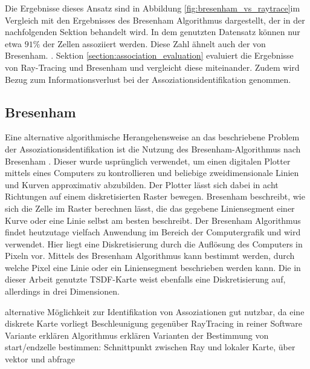 Die Ergebnisse dieses Ansatz sind in Abbildung \ref{fig:bresenham_vs_raytrace}im Vergleich mit den Ergebnisses des Bresenham Algorithmus dargestellt, der in der nachfolgenden Sektion behandelt wird. In dem genutzten Datensatz können nur etwa $91\%$ der Zellen assoziiert werden. Diese Zahl ähnelt auch der von Bresenham. . Sektion \ref{section:association_evaluation} evaluiert die Ergebnisse von Ray-Tracing und Bresenham und vergleicht diese miteinander. Zudem wird Bezug zum Informationsverlust bei der Assoziationsidentifikation genommen.




\subsection{Bresenham}

Eine alternative algorithmische Herangehensweise an das beschriebene Problem der Assoziationsidentifikation ist die Nutzung des Bresenham-Algorithmus nach Bresenham \cite{bresenham1965algorithm}. Dieser wurde usprünglich verwendet, um einen digitalen Plotter mittels eines Computers zu kontrollieren und beliebige zweidimensionale Linien und Kurven approximativ abzubilden. Der Plotter lässt sich dabei in acht Richtungen auf einem diskretisierten Raster bewegen. Bresenham \cite{bresenham1965algorithm} beschreibt, wie sich die Zelle im Raster berechnen lässt, die das gegebene Liniensegment einer Kurve oder eine Linie selbst am besten beschreibt. Der Bresenham Algorithmus findet heutzutage vielfach Anwendung im Bereich der Computergrafik und wird verwendet. Hier liegt eine Diskretisierung durch die Auflösung des Computers in Pixeln vor. Mittels des Bresenham Algorithmus kann bestimmt werden, durch welche Pixel eine Linie oder ein Liniensegment beschrieben werden kann. Die in dieser Arbeit genutzte TSDF-Karte weist ebenfalls eine Diskretisierung auf, allerdings in drei Dimensionen.  



alternative Möglichkeit zur Identifikation von Assoziationen
gut nutzbar, da eine diskrete Karte vorliegt
Beschleunigung gegenüber RayTracing in reiner Software Variante erklären
Algorithmus erklären
Varianten der Bestimmung von start/endzelle bestimmen: Schnittpunkt zwischen Ray und lokaler Karte, über vektor und abfrage

